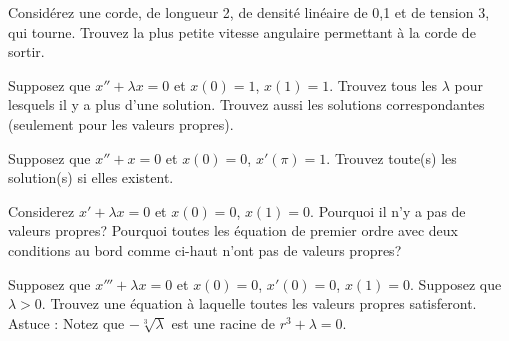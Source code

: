 \setcounter{exercise}{100}

\begin{exercise}
Considérez une corde, de longueur 2, de densité linéaire de 0,1 et de tension 3,  qui tourne. Trouvez la plus petite vitesse angulaire permettant à la corde de sortir. 
\end{exercise}

\begin{exercise}
Supposez que $x'' + \lambda x = 0$ et $x(0)=1$, $x(1) = 1$.
Trouvez tous les $\lambda$ pour lesquels il y a plus d'une solution. Trouvez aussi les solutions correspondantes (seulement pour les valeurs propres). 
\end{exercise}

\begin{exercise}
Supposez que $x'' + x = 0$ et $x(0)=0$, $x'(\pi) = 1$.
Trouvez toute(s) les solution(s) si elles existent.  
\end{exercise}

\begin{exercise}
Considerez
$x' + \lambda x = 0$ et $x(0)=0$, $x(1) = 0$.  Pourquoi il n'y a pas de valeurs propres? Pourquoi toutes les équation de premier ordre avec deux conditions au bord comme ci-haut n'ont pas de valeurs propres? 
\end{exercise}

\begin{exercise}[défi]
Supposez que $x''' + \lambda x = 0$ et $x(0)=0$, $x'(0) = 0$, $x(1) = 0$.
Supposez que  $\lambda > 0$.  Trouvez une équation à laquelle toutes les valeurs propres satisferont. 
Astuce : Notez que $-\sqrt[3]{\lambda}$ est une racine de $r^3+\lambda = 0$.
\end{exercise}


